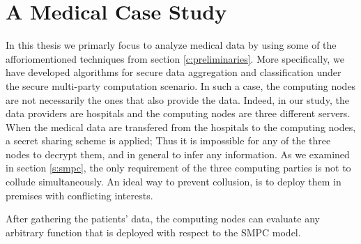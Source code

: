 \chapter{A Medical Case Study}\label{c:medical-study}

In this thesis we primarly focus to analyze medical data by using some of the afforiomentioned techniques from section \ref{c:preliminaries}.
More specifically, we have developed algorithms for secure data aggregation and classification under the secure multi-party computation scenario.
In such a case, the computing nodes are not necessarily the ones that also provide the data.
Indeed, in our study, the data providers are hospitals and the computing nodes are three different servers.
When the medical data are transfered from the hospitals to the computing nodes, a secret sharing scheme is applied; Thus it is impossible for any of the three nodes to decrypt them, and in general to infer any information.
As we examined in section \ref{s:smpc}, the only requirement of the three computing parties is not to collude simultaneously.
An ideal way to prevent collusion, is to deploy them in premises with conflicting interests.


After gathering the patients' data, the computing nodes can evaluate any arbitrary function that is deployed with respect to the SMPC model.

